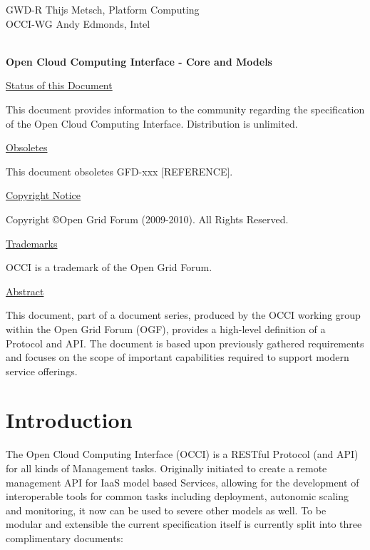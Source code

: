\documentclass[10pt,a4paper]{article}
\begin{document}
\thispagestyle{empty}

GWD-R \hfill  Thijs Metsch, Platform Computing\\
OCCI-WG \hfill  Andy Edmonds, Intel\\
\\

\vspace*{0.5in}

\begin{Large}
\textbf{Open Cloud Computing Interface - Core and Models}
\end{Large}

\vspace*{0.5in}

\underline{Status of this Document}

This document provides information to the community regarding the specification of the Open Cloud Computing Interface. Distribution is unlimited.

\underline{Obsoletes}

This document obsoletes GFD-xxx [REFERENCE].

\underline{Copyright Notice}

Copyright \copyright Open Grid Forum (2009-2010). All Rights Reserved.

\underline{Trademarks}

OCCI is a trademark of the Open Grid Forum.

\underline{Abstract}

This document, part of a document series, produced by the OCCI working group within the Open Grid Forum (OGF), provides a high-level definition of a Protocol and API. The document is based upon previously gathered requirements and focuses on the scope of important capabilities required to support modern service offerings. 

\newpage
\tableofcontents
\newpage

\section{Introduction}
The Open Cloud Computing Interface (OCCI) is a RESTful Protocol (and API) for all kinds of Management tasks. Originally initiated to create a remote management API for IaaS model based Services, allowing for the development of interoperable tools for common tasks including deployment, autonomic scaling and monitoring, it now can be used to severe other models as well. To be modular and extensible the current specification itself is currently split into three complimentary documents:
\end{document}
